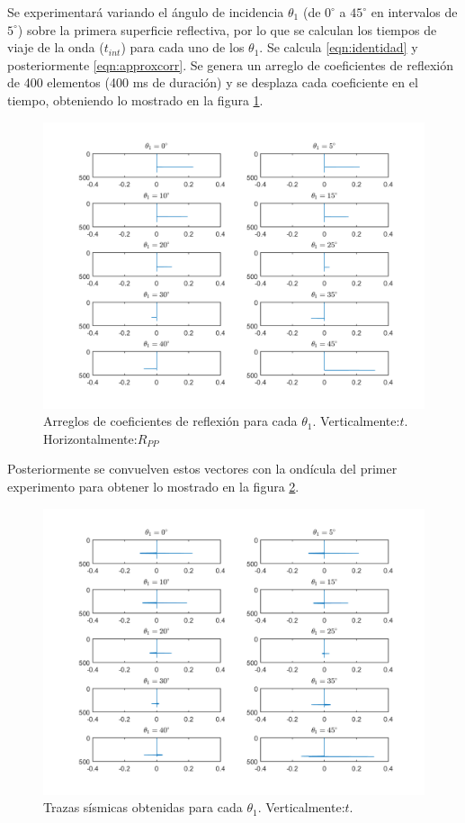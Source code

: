 \documentclass[%
 aip,
 jmp,%
 amsmath,amssymb,
 reprint,%
]{revtex4-1}
\begin{document}
Se experimentará variando el ángulo de incidencia $\theta_1$ (de $0^{\circ}$ a $45^{\circ}$ en intervalos de $5^{\circ}$) sobre la primera superficie reflectiva, por lo que se calculan los tiempos de viaje de la onda ($t_{int}$) para cada uno de los $\theta_1$. Se calcula \ref{eqn:identidad} y posteriormente \ref{eqn:approxcorr}. Se genera un arreglo de coeficientes de reflexión de 400 elementos (400 ms de duración) y se desplaza cada coeficiente en el tiempo, obteniendo lo mostrado en la figura \ref{fig:rpps}.\\



\begin{figure}[h]
\centering
\includegraphics[width=1\linewidth]{rpps}
\caption{Arreglos de coeficientes de reflexión para cada $\theta_1$. Verticalmente:$t$. Horizontalmente:$R_{PP}$}
\label{fig:rpps}
\end{figure}

Posteriormente se convuelven estos vectores con la ondícula del primer experimento para obtener lo mostrado en la figura \ref{fig:trazas2}.

\begin{figure}[h]
	\centering
	\includegraphics[width=1\linewidth]{trazas2}
	\caption{Trazas sísmicas obtenidas para cada $\theta_1$. Verticalmente:$t$.}
	\label{fig:trazas2}
\end{figure}
\end{document}

